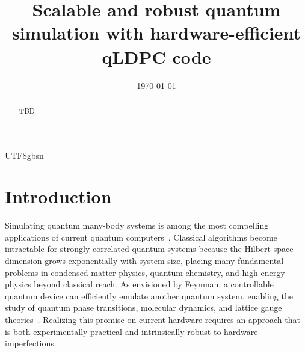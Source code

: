 \documentclass[%
10pt,tightenlines,
superscriptaddress,
 amsmath,amssymb,
 aps,
pra,
]{revtex4-2}
\begin{document}
\begin{CJK}{UTF8}{gbsn}



\title{Scalable and robust quantum simulation with hardware-efficient qLDPC code}


\date{\today}


\begin{abstract}
TBD
\end{abstract}



\maketitle
\end{CJK}
\section{Introduction}
Simulating quantum many-body systems is among the most compelling applications of current quantum computers~\cite{feynman1982simulating,lloyd1996universal}. Classical algorithms become intractable for strongly correlated quantum systems because the Hilbert space dimension grows exponentially with system size, placing many fundamental problems in condensed-matter physics, quantum chemistry, and high-energy physics beyond classical reach. As envisioned by Feynman, a controllable quantum device can efficiently emulate another quantum system, enabling the study of quantum phase transitions, molecular dynamics, and lattice gauge theories~\cite{bernien2017probing-many-body-51-atom,browaeys2020many-body-phys-individually-Rydberg,bluvstein2021controlling-many-body-Rydberg}. Realizing this promise on current hardware requires an approach that is both experimentally practical and intrinsically robust to hardware imperfections.
\end{document}
